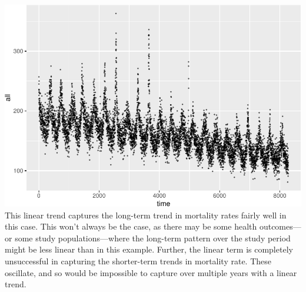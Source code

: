 \documentclass[
]{book}
\newenvironment{Shaded}{\begin{snugshade}}{\end{snugshade}}
\newcommand{\DataTypeTok}[1]{\textcolor[rgb]{0.13,0.29,0.53}{#1}}
\newcommand{\FloatTok}[1]{\textcolor[rgb]{0.00,0.00,0.81}{#1}}
\newcommand{\KeywordTok}[1]{\textcolor[rgb]{0.13,0.29,0.53}{\textbf{#1}}}
\newcommand{\NormalTok}[1]{#1}
\newcommand{\OperatorTok}[1]{\textcolor[rgb]{0.81,0.36,0.00}{\textbf{#1}}}
\newcommand{\StringTok}[1]{\textcolor[rgb]{0.31,0.60,0.02}{#1}}
\begin{document}
\begin{Shaded}
\end{Shaded}

\includegraphics{adv_epi_analysis_files/figure-latex/unnamed-chunk-46-1.pdf}
This linear trend captures the long-term trend in mortality rates fairly well in
this case. This won't always be the case, as there may be some health
outcomes---or some study populations---where the long-term pattern over the
study period might be less linear than in this example. Further, the linear
term is completely unsuccessful in capturing the shorter-term trends in mortality
rate. These oscillate, and so would be impossible to capture over multiple
years with a linear trend.
\end{document}
